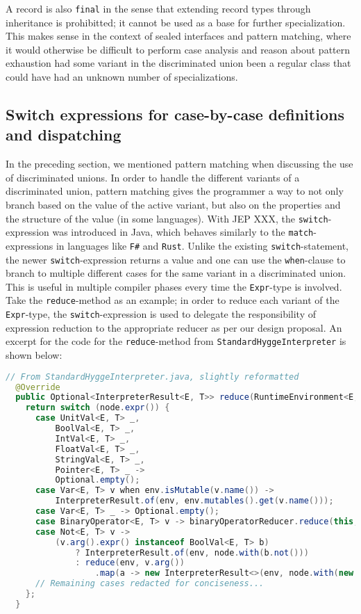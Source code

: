 A record is also \texttt{final} in the sense that extending record types through inheritance is prohibitted; it cannot be used as a base for
further specialization. This makes sense in the context of sealed interfaces and pattern matching, where it would otherwise be difficult
to perform case analysis and reason about pattern exhaustion had some variant in the discriminated union been a regular class that could
have had an unknown number of specializations.

\subsection{Switch expressions for case-by-case definitions and dispatching}

In the preceding section, we mentioned pattern matching when discussing the use of discriminated unions. In order to handle the different variants
of a discriminated union, pattern matching gives the programmer a way to not only branch based on the value of the active variant, but also on
the properties and the structure of the value (in some languages). With JEP XXX, the \texttt{switch}-expression was introduced in Java, which behaves
similarly to the \texttt{match}-expressions in languages like \texttt{F\#} and \texttt{Rust}. Unlike the existing \texttt{switch}-statement,
the newer \texttt{switch}-expression returns a value and one can use the \texttt{when}-clause to branch to multiple different cases for the
same variant in a discriminated union. This is useful in multiple compiler phases every time the \texttt{Expr}-type is involved. Take
the \texttt{reduce}-method as an example; in order to reduce each variant of the \texttt{Expr}-type, the \texttt{switch}-expression is used
to delegate the responsibility of expression reduction to the appropriate reducer as per our design proposal. An excerpt for the code
for the \texttt{reduce}-method from \texttt{StandardHyggeInterpreter} is shown below:

\begin{lstlisting}[language=Java]
  // From StandardHyggeInterpreter.java, slightly reformatted
  @Override
  public Optional<InterpreterResult<E, T>> reduce(RuntimeEnvironment<E, T> env, Node<E, T> node) {
    return switch (node.expr()) {
      case UnitVal<E, T> _,
          BoolVal<E, T> _,
          IntVal<E, T> _,
          FloatVal<E, T> _,
          StringVal<E, T> _,
          Pointer<E, T> _ ->
          Optional.empty();
      case Var<E, T> v when env.isMutable(v.name()) ->
          InterpreterResult.of(env, env.mutables().get(v.name()));
      case Var<E, T> _ -> Optional.empty();
      case BinaryOperator<E, T> v -> binaryOperatorReducer.reduce(this, env, node, v);
      case Not<E, T> v ->
          (v.arg().expr() instanceof BoolVal<E, T> b)
              ? InterpreterResult.of(env, node.with(b.not()))
              : reduce(env, v.arg())
                  .map(a -> new InterpreterResult<>(env, node.with(new Not<>(a.node()))));
      // Remaining cases redacted for conciseness...
    };
  }
\end{lstlisting}

